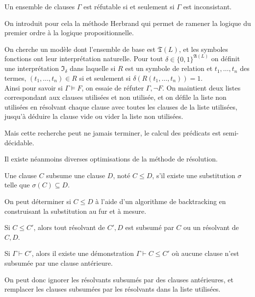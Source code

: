 \documentclass[a4paper]{article}
\begin{document}
\begin{theorem}
  Un ensemble de clauses $\Gamma$ est réfutable si et seulement si $\Gamma$ est inconsistant.
\end{theorem}

On introduit pour cela la méthode Herbrand qui permet de ramener la logique du premier ordre à la logique propositionnelle.

On cherche un modèle dont l'ensemble de base est $\mathfrak{T}(L)$, et les symboles fonctions ont leur interprétation naturelle. Pour tout $\delta\in\{0,1\}^{\mathfrak{A}(L)}$ on définit une interprétation $\mathfrak{I}_\delta$ dans laquelle si $R$ est un symbole de relation et $t_1,\dots,t_n$ des termes, $(t_1,\dots,t_n)\in R$ si et seulement si $\delta(R(t_1,\dots,t_n))=1$.\\

Ainsi pour savoir si $\Gamma\models F$, on essaie de réfuter $\Gamma,\neg F$.
On maintient deux listes correspondant aux clauses utilisées et non utilisée, et on défile la liste non utilisées en résolvant chaque clause avec toutes les clauses de la liste utilisées, jusqu'à déduire la clause vide ou vider la liste non utilisées.

Mais cette recherche peut ne jamais terminer, le calcul des prédicats est semi-décidable.

Il existe néanmoins diverses optimisations de la méthode de résolution.

\begin{definition}
  Une clause $C$ subsume une clause $D$, noté $C\leq D$, s'il existe une substitution $\sigma$ telle que $\sigma(C)\subseteq D$.
\end{definition}

On peut déterminer si $C\leq D$ à l'aide d'un algorithme de backtracking en construisant la substitution au fur et à mesure.

\begin{theorem}
  Si $C\leq C'$, alors tout résolvant de $C',D$ est subsumé par $C$ ou un résolvant de $C,D$.
\end{theorem}

\begin{corollary}
  Si $\Gamma\vdash C'$, alors il existe une démonstration $\Gamma\vdash C\leq C'$ où aucune clause n'est subsumée par une clause antérieure.
\end{corollary}

On peut donc ignorer les résolvants subsumés par des clauses antérieures, et remplacer les clauses subsumées par les résolvants dans la liste utilisées.
\end{document}
